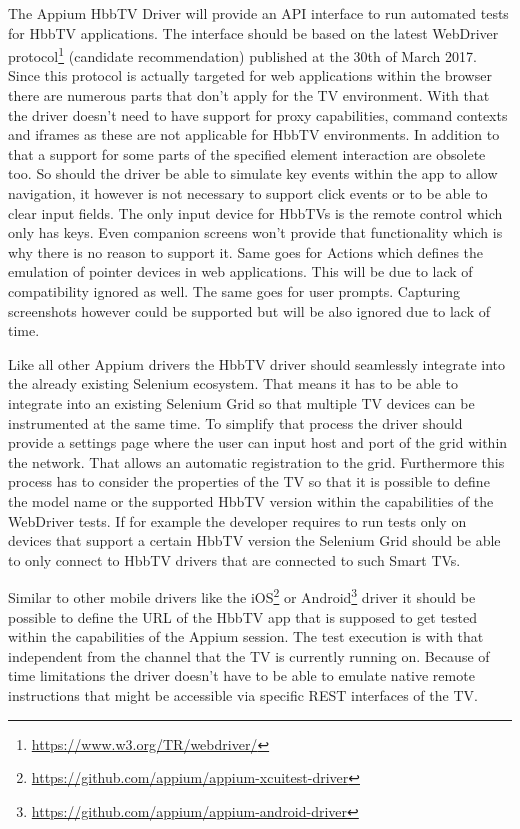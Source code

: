 The Appium HbbTV Driver will provide an API interface to run automated tests for HbbTV
applications. The interface should be based on the latest WebDriver protocol\footnote{\url{https://www.w3.org/TR/webdriver/}} (candidate
recommendation) published at the 30th of March 2017. Since this protocol is actually targeted
for web applications within the browser there are numerous parts that don't apply for the
TV environment. With that the driver doesn't need to have support for proxy capabilities,
command contexts and iframes as these are not applicable for HbbTV environments. In addition
to that a support for some parts of the specified element interaction are obsolete too. So
should the driver be able to simulate key events within the app to allow navigation, it
however is not necessary to support click events or to be able to clear input fields. The
only input device for HbbTVs is the remote control which only has keys. Even companion screens
won't provide that functionality which is why there is no reason to support it. Same goes
for Actions which defines the emulation of pointer devices in web applications. This will
be due to lack of compatibility ignored as well. The same goes for user prompts. Capturing
screenshots however could be supported but will be also ignored due to lack of time.

Like all other Appium drivers the HbbTV driver should seamlessly integrate into the already
existing Selenium ecosystem. That means it has to be able to integrate into an existing
Selenium Grid so that multiple TV devices can be instrumented at the same time. To simplify
that process the driver should provide a settings page where the user can input host and port
of the grid within the network. That allows an automatic registration to the grid. Furthermore
this process has to consider the properties of the TV so that it is possible to define the
model name or the supported HbbTV version within the capabilities of the WebDriver tests.
If for example the developer requires to run tests only on devices that support a certain
HbbTV version the Selenium Grid should be able to only connect to HbbTV drivers that are
connected to such Smart TVs.

Similar to other mobile drivers like the iOS\footnote{\url{https://github.com/appium/appium-xcuitest-driver}}
or Android\footnote{\url{https://github.com/appium/appium-android-driver}} driver it should
be possible to define the URL of the HbbTV app that is supposed to get tested within the
capabilities of the Appium session. The test execution is with that independent from the
channel that the TV is currently running on. Because of time limitations the driver doesn't
have to be able to emulate native remote instructions that might be accessible via specific
REST interfaces of the TV.

